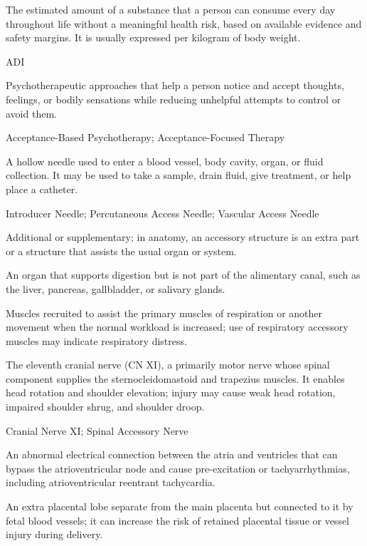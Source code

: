  The estimated amount of a substance that a person can consume every day throughout life without a meaningful health risk, based on available evidence and safety margins. It is usually expressed per kilogram of body weight.

\synonyms
ADI

 Psychotherapeutic approaches that help a person notice and accept thoughts, feelings, or bodily sensations while reducing unhelpful attempts to control or avoid them.

\synonyms
Acceptance-Based Psychotherapy; Acceptance-Focused Therapy

 A hollow needle used to enter a blood vessel, body cavity, organ, or fluid collection. It may be used to take a sample, drain fluid, give treatment, or help place a catheter.

\synonyms
Introducer Needle; Percutaneous Access Needle; Vascular Access Needle

 Additional or supplementary; in anatomy, an accessory structure is an extra part or a structure that assists the usual organ or system.

 An organ that supports digestion but is not part of the alimentary canal, such as the liver, pancreas, gallbladder, or salivary glands.

 Muscles recruited to assist the primary muscles of respiration or another movement when the normal workload is increased; use of respiratory accessory muscles may indicate respiratory distress.

 The eleventh cranial nerve (CN XI), a primarily motor nerve whose spinal component supplies the sternocleidomastoid and trapezius muscles. It enables head rotation and shoulder elevation; injury may cause weak head rotation, impaired shoulder shrug, and shoulder droop.

\synonyms
Cranial Nerve XI; Spinal Accessory Nerve

 An abnormal electrical connection between the atria and ventricles that can bypass the atrioventricular node and cause pre-excitation or tachyarrhythmias, including atrioventricular reentrant tachycardia.

 An extra placental lobe separate from the main placenta but connected to it by fetal blood vessels; it can increase the risk of retained placental tissue or vessel injury during delivery.

